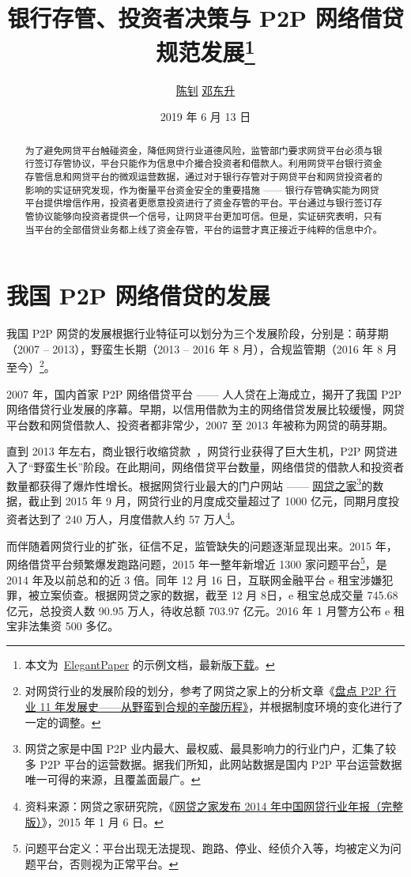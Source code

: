 \documentclass[lang=cn,11pt]{elegantpaper}
\title{银行存管、投资者决策与 P2P 网络借贷规范发展\footnote{本文为~\href{https://github.com/ElegantLaTeX/ElegantPaper}{ElegantPaper} 的示例文档，最新版\href{https://github.com/EthanDeng/bank-custody}{下载}。}}
\author{\href{http://www.cces.fudan.edu.cn/researchdetail.aspx?id=6}{陈钊} \quad \href{https://ddswhu.me/}{邓东升}}
\institute{复旦大学 \; 经济学院\\ 中国社会主义市场经济研究中心}
\date{2019 年 6 月 13 日}
\begin{document}
\maketitle

\begin{abstract}
为了避免网贷平台触碰资金，降低网贷行业道德风险，监管部门要求网贷平台必须与银行签订存管协议，平台只能作为信息中介撮合投资者和借款人。利用网贷平台银行资金存管信息和网贷平台的微观运营数据，通过对于银行存管对于网贷平台和网贷投资者的影响的实证研究发现，作为衡量平台资金安全的重要措施 —— 银行存管确实能为网贷平台提供增信作用，投资者更愿意投资进行了资金存管的平台。平台通过与银行签订存管协议能够向投资者提供一个信号，让网贷平台更加可信。但是，实证研究表明，只有当平台的全部借贷业务都上线了资金存管，平台的运营才真正接近于纯粹的信息中介。
\end{abstract}

\section{我国 P2P 网络借贷的发展}
我国 P2P 网贷的发展根据行业特征可以划分为三个发展阶段，分别是：萌芽期（2007 -- 2013），野蛮生长期（2013 -- 2016 年 8 月），合规监管期（2016 年 8 月至今）\footnote{对网贷行业的发展阶段的划分，参考了网贷之家上的分析文章《\href{https://www.wdzj.com/zhuanlan/guancha/17-10089-1.html}{盘点 P2P 行业 11 年发展史——从野蛮到合规的辛酸历程》}，并根据制度环境的变化进行了一定的调整。}。

2007 年，国内首家 P2P 网络借贷平台 —— 人人贷在上海成立，揭开了我国 P2P 网络借贷行业发展的序幕。早期，以信用借款为主的网络借贷发展比较缓慢，网贷平台数和网贷借款人、投资者都非常少，2007 至 2013 年被称为网贷的萌芽期。

直到 2013 年左右，商业银行收缩贷款~\citep{pmm2014}，网贷行业获得了巨大生机，P2P 网贷进入了“野蛮生长”阶段。在此期间，网络借贷平台数量，网络借贷的借款人和投资者数量都获得了爆炸性增长。根据网贷行业最大的门户网站 —— \href{https://www.wdzj.com/}{网贷之家}\footnote{网贷之家是中国 P2P 业内最大、最权威、最具影响力的行业门户，汇集了较多 P2P 平台的运营数据。据我们所知，此网站数据是国内 P2P 平台运营数据唯一可得的来源，且覆盖面最广。}的数据，截止到 2015 年 9 月，网贷行业的月度成交量超过了 1000 亿元，同期月度投资者达到了 240 万人，月度借款人约 57 万人\footnote{资料来源：网贷之家研究院，《\href{https://www.wdzj.com/news/baogao/16305.html}{网贷之家发布 2014 年中国网贷行业年报（完整版）}》，2015 年 1 月 6 日。}。

而伴随着网贷行业的扩张，征信不足，监管缺失的问题逐渐显现出来。2015 年，网络借贷平台频繁爆发跑路问题，2015 年一整年新增近 1300 家问题平台\footnote{问题平台定义：平台出现无法提现、跑路、停业、经侦介入等，均被定义为问题平台，否则视为正常平台。}，是 2014 年及以前总和的近 3 倍。同年 12 月 16 日，互联网金融平台 e 租宝涉嫌犯罪，被立案侦查。根据网贷之家的数据，截至 12 月 8日，e 租宝总成交量 745.68 亿元，总投资人数 90.95 万人，待收总额 703.97 亿元。2016 年 1 月警方公布 e 租宝非法集资 500 多亿。
\end{document}
